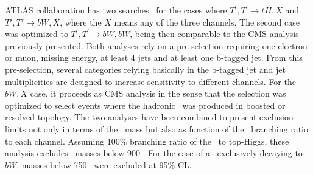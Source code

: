 ATLAS collaboration has two searches~\cite{ATLAS-CONF-2015-012} for the cases where ${T^{'},T^{'}\rightarrow tH,X}$ and ${T',T'\rightarrow bW,X}$, where the $X$ means any of the three channels. The second case was optimized to $T^{'},T^{'}\rightarrow bW,bW$, being then comparable to the CMS analysis previously presented. Both analyses rely on a pre-selection requiring one electron or muon, missing energy, at least 4 jets and at least one b-tagged jet. From this pre-selection, several categories relying basically in the b-tagged jet and jet multiplicities are designed to increase sensitivity to different channels. For the ${bW,X}$ case, it proceeds as CMS analysis in the sense that the selection was optimized to select events where the hadronic \W~was produced in boosted or resolved topology. The two analyses have been combined to present exclusion limits not only in terms of the \Tp~mass but also as function of the \Tp~branching ratio to each channel. Assuming 100\% branching ratio of the \Tp~to top-Higgs, these analysis excludes \Tp~masses below 900 \GeVcc. For the case of a \Tp~exclusively decaying to $bW$, masses below 750 \GeVcc~were excluded at 95\% CL.

